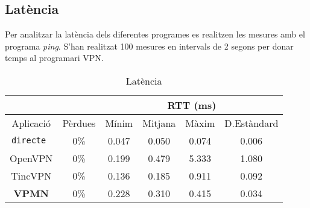 \subsection{Latència}
Per analitzar la latència dels diferentes programes es realitzen les mesures amb el programa \emph{ping}. S'han realitzat 100 mesures en intervals de 2 segons per donar temps al programari VPN.
\begin{table}[htb]
\begin{center}
\begin{tabular}{|c|c|c|c|c|c|}
\multicolumn{2}{c}{} & \multicolumn{4}{|c|}{RTT (ms)} \\ \hline
Aplicació & Pèrdues & Mínim & Mitjana & Màxim & D.Estàndard \\ \hline \hline
\tt directe & 0\% & 0.047 & 0.050 & 0.074 & 0.006 \\ \hline
OpenVPN & 0\% & 0.199 & 0.479 & 5.333 & 1.080 \\ \hline
TincVPN & 0\% & 0.136 & 0.185 & 0.911 & 0.092 \\ \hline
\bf VPMN & 0\% & 0.228 & 0.310 & 0.415 & 0.034 \\ \hline
\end{tabular}
\end{center}
\begin{center}
\caption{Latència}
\label{T:lat}
\end{center}
\end{table}

